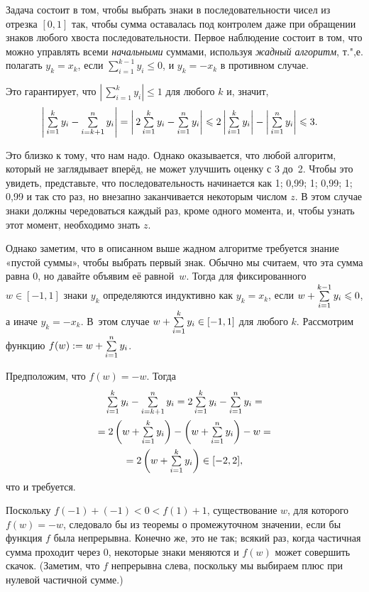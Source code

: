 \documentclass[twoside]{book}
\begin{document}
\medskip

Задача состоит в том, чтобы выбрать знаки в последовательности чисел из отрезка $[0,1]$ так, чтобы сумма оставалась под контролем даже при обращении знаков любого хвоста последовательности.
Первое наблюдение состоит в том, что можно управлять всеми \emph{начальными} суммами, используя \emph{жадный алгоритм}, т.",е. полагать $y_k=x_k$, если $\sum\limits_{i=1}^{k-1}y_i \le 0$, и $y_k=-x_k$ в противном случае.

Это гарантирует, что $\left|\,\sum\limits_{i=1}^{k}y_i\right| \le 1$ для любого $k$ и, значит,
\begin{align*}
\left|\,\mathop{\textstyle\sum}\limits_{i=1}^{k}y_i-\mathop{\textstyle\sum}\limits_{i=k+1}^{n}y_i\right|&=\left|\,2\mathop{\textstyle\sum}\limits_{i=1}^{k}y_i-\mathop{\textstyle\sum}\limits_{i=1}^{n}y_i\right|
\leqslant2\left|\,\mathop{\textstyle\sum}\limits_{i=1}^{k}y_i\right|-\left|\,\mathop{\textstyle\sum}\limits_{i=1}^{n}y_i\right|\leqslant3.
\end{align*}

Это близко к тому, что нам надо. 
Однако оказывается, что любой алгоритм, который не заглядывает вперёд, не может улучшить оценку с 3 до~2.
Чтобы это увидеть, представьте, что последовательность начинается как
1; 0,99; 1; 0,99; 1; 0,99 и так сто раз, но внезапно заканчивается некоторым числом $z$.
В этом случае знаки должны чередоваться каждый раз, кроме одного момента, и, чтобы узнать этот момент, необходимо знать $z$.

Однако заметим, что в описанном выше жадном алгоритме требуется знание «пустой суммы», чтобы выбрать первый знак.
Обычно мы считаем, что эта сумма равна 0, но давайте объявим её равной~$w$.
Тогда для фиксированного $w\in [-1,1]$ знаки $y_k$ определяются индуктивно как $y_k=x_k$, если $w+\mathop{\textstyle\sum}\limits_{i=1}^{k-1}y_i \leqslant 0$, а иначе $y_k=-x_k$.
В~этом случае $w+\mathop{\textstyle\sum}\limits_{i=1}^{k}y_i \in[-1,1]$ для любого $k$.
Рассмотрим функцию $f(w) := w+\mathop{\textstyle\sum}\limits_{i=1}^ny_i$.

Предположим, что $f(w)=-w$.
Тогда
\begin{multline*}
\mathop{\textstyle\sum}\limits_{i=1}^{k}y_i-\mathop{\textstyle\sum}\limits_{i=k+1}^{n}y_i=
2\mathop{\textstyle\sum}\limits_{i=1}^{k}y_i-\mathop{\textstyle\sum}\limits_{i=1}^{n}y_i=\\=
2\left(w+\mathop{\textstyle\sum}\limits_{i=1}^{k}y_i\right)-\left(w+\mathop{\textstyle\sum}\limits_{i=1}^{n}y_i\right)-w=\\=
2\left(w+\mathop{\textstyle\sum}\limits_{i=1}^{k}y_i\right)\in[-2,2],
\end{multline*}
что и требуется.

Поскольку $f(-1)+(-1)<0<f(1)+1$, существование $w$, для которого $f(w)=-w$, следовало бы из теоремы о промежуточном значении, если бы функция $f$ была непрерывна.
Конечно же, это не так; всякий раз, когда частичная сумма проходит через 0, некоторые знаки меняются и $f(w)$ может совершить скачок.
(Заметим, что $f$ непрерывна слева, поскольку мы выбираем плюс при нулевой частичной сумме.)
\end{document}
